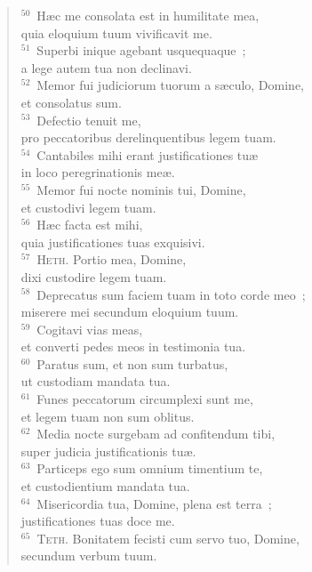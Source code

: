 \begin{verse}
${}^{50}$~H\ae c me consolata est in humilitate mea,\\ quia eloquium tuum vivificavit me.\\
${}^{51}$~Superbi inique agebant usquequaque~;\\ a lege autem tua non declinavi.\\
${}^{52}$~Memor fui judiciorum tuorum a s\ae culo, Domine,\\ et consolatus sum.\\
${}^{53}$~Defectio tenuit me,\\ pro peccatoribus derelinquentibus legem tuam.\\
${}^{54}$~Cantabiles mihi erant justificationes tu\ae \\ in loco peregrinationis me\ae .\\
${}^{55}$~Memor fui nocte nominis tui, Domine,\\ et custodivi legem tuam.\\
${}^{56}$~H\ae c facta est mihi,\\ quia justificationes tuas exquisivi.\\
${}^{57}$~\textsc{Heth.} Portio mea, Domine,\\ dixi custodire legem tuam.\\
${}^{58}$~Deprecatus sum faciem tuam in toto corde meo~;\\ miserere mei secundum eloquium tuum.\\
${}^{59}$~Cogitavi vias meas,\\ et converti pedes meos in testimonia tua.\\
${}^{60}$~Paratus sum, et non sum turbatus,\\ ut custodiam mandata tua.\\
${}^{61}$~Funes peccatorum circumplexi sunt me,\\ et legem tuam non sum oblitus.\\
${}^{62}$~Media nocte surgebam ad confitendum tibi,\\ super judicia justificationis tu\ae .\\
${}^{63}$~Particeps ego sum omnium timentium te,\\ et custodientium mandata tua.\\
${}^{64}$~Misericordia tua, Domine, plena est terra~;\\ justificationes tuas doce me.\\
${}^{65}$~\textsc{Teth.} Bonitatem fecisti cum servo tuo, Domine,\\ secundum verbum tuum.\\

\end{verse}
